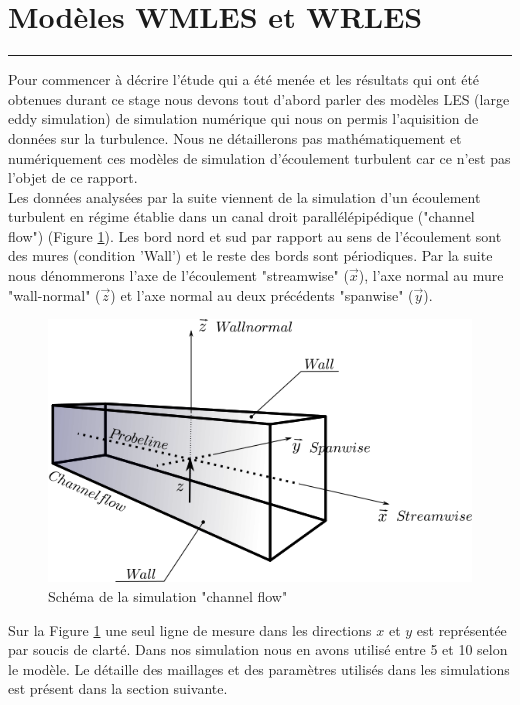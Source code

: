 \documentclass[12pt]{article}
\theoremstyle{plain}
\theoremstyle{remark}
\newcommand{\vect}{\overrightarrow}
\begin{document}
\section{Modèles WMLES et WRLES}
\noindent\rule{\linewidth}{2pt}
\vspace{0.1cm}

Pour commencer à décrire l'étude qui a été menée et les résultats qui ont été obtenues durant ce stage nous devons tout d'abord parler des modèles LES (large eddy simulation) de simulation numérique qui nous on permis l'aquisition de données sur la turbulence. Nous ne détaillerons pas mathématiquement et numériquement ces modèles de simulation d'écoulement turbulent car ce n'est pas l'objet de ce rapport. \\

Les données analysées par la suite viennent de la simulation d'un écoulement turbulent en régime établie dans un canal droit parallélépipédique ("channel flow") (Figure \ref{fig:channel_flow}). Les bord nord et sud par rapport au sens de l'écoulement sont des mures (condition 'Wall') et le reste des bords sont périodiques. Par la suite nous dénommerons l'axe de l'écoulement "streamwise" ($\vect{x}$), l'axe normal au mure "wall-normal" ($\vect{z}$) et l'axe normal au deux précédents "spanwise" ($\vect{y}$). \\

\begin{figure}[h!]
	\begin{center}
		\includegraphics[width=0.62\linewidth]{../../report/referance/channel_flow.png}
		\caption{Schéma de la simulation "channel flow"}
		\label{fig:channel_flow}
	\end{center}
\end{figure}

Sur la Figure \ref{fig:channel_flow} une seul ligne de mesure dans les directions $x$ et $y$ est représentée par soucis de clarté. Dans nos simulation nous en avons utilisé entre 5 et 10 selon le modèle. Le détaille des maillages et des paramètres utilisés dans les simulations est présent dans la section suivante. \\
\end{document}
